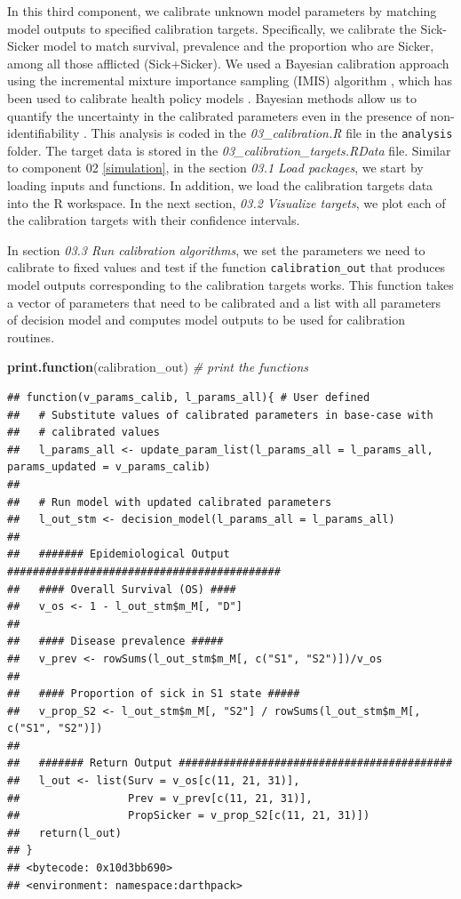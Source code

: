 \documentclass[]{book}
\newenvironment{Shaded}{\begin{snugshade}}{\end{snugshade}}
\newcommand{\KeywordTok}[1]{\textcolor[rgb]{0.13,0.29,0.53}{\textbf{#1}}}
\newcommand{\CommentTok}[1]{\textcolor[rgb]{0.56,0.35,0.01}{\textit{#1}}}
\newcommand{\NormalTok}[1]{#1}
\begin{document}
In this third component, we calibrate unknown model parameters by
matching model outputs to specified calibration targets. Specifically,
we calibrate the Sick-Sicker model to match survival, prevalence and the
proportion who are Sicker, among all those afflicted (Sick+Sicker). We
used a Bayesian calibration approach using the incremental mixture
importance sampling (IMIS) algorithm \citep{Steele2006}, which has been
used to calibrate health policy models \citep[\citet{Menzies2017},
\citet{Rutter2018}]{Raftery2010}. Bayesian methods allow us to quantify
the uncertainty in the calibrated parameters even in the presence of
non-identifiability \citep{Alarid-Escudero2018b}. This analysis is coded
in the \emph{03\_calibration.R} file in the \texttt{analysis} folder.
The target data is stored in the \emph{03\_calibration\_targets.RData}
file. Similar to component 02 \ref{simulation}, in the section
\emph{03.1 Load packages}, we start by loading inputs and functions. In
addition, we load the calibration targets data into the R workspace. In
the next section, \emph{03.2 Visualize targets}, we plot each of the
calibration targets with their confidence intervals.

In section \emph{03.3 Run calibration algorithms}, we set the parameters
we need to calibrate to fixed values and test if the function
\texttt{calibration\_out} that produces model outputs corresponding to
the calibration targets works. This function takes a vector of
parameters that need to be calibrated and a list with all parameters of
decision model and computes model outputs to be used for calibration
routines.

\begin{Shaded}
\begin{Highlighting}[]
\KeywordTok{print.function}\NormalTok{(calibration_out) }\CommentTok{# print the functions}
\end{Highlighting}
\end{Shaded}

\begin{verbatim}
## function(v_params_calib, l_params_all){ # User defined
##   # Substitute values of calibrated parameters in base-case with 
##   # calibrated values
##   l_params_all <- update_param_list(l_params_all = l_params_all, params_updated = v_params_calib)
##   
##   # Run model with updated calibrated parameters
##   l_out_stm <- decision_model(l_params_all = l_params_all)
##   
##   ####### Epidemiological Output ###########################################
##   #### Overall Survival (OS) ####
##   v_os <- 1 - l_out_stm$m_M[, "D"]
##   
##   #### Disease prevalence #####
##   v_prev <- rowSums(l_out_stm$m_M[, c("S1", "S2")])/v_os
##   
##   #### Proportion of sick in S1 state #####
##   v_prop_S2 <- l_out_stm$m_M[, "S2"] / rowSums(l_out_stm$m_M[, c("S1", "S2")])
##   
##   ####### Return Output ###########################################
##   l_out <- list(Surv = v_os[c(11, 21, 31)],
##                 Prev = v_prev[c(11, 21, 31)],
##                 PropSicker = v_prop_S2[c(11, 21, 31)])
##   return(l_out)
## }
## <bytecode: 0x10d3bb690>
## <environment: namespace:darthpack>
\end{verbatim}
\end{document}
